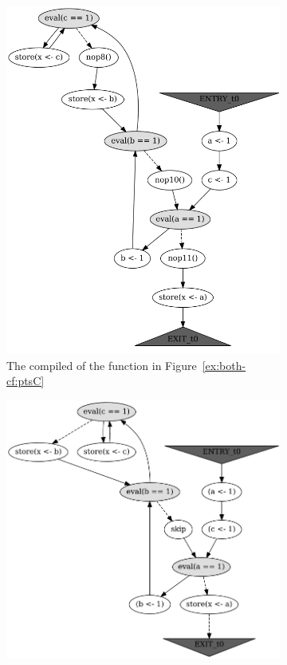 \begin{figure}[!h]
%
\begin{subfigure}[b]{.49\textwidth}\centering
  \includegraphics[width=\textwidth,keepaspectratio]{img/my/graphs/unrolling-comparison/PorthosC/t0.png}
  \hfill
  \caption{The compiled \xgraph{} of the function in Figure~\ref{ex:both-cf:ptsC}}
  \label{ex:both-cf:graph:ptsC}
\end{subfigure}
%
\begin{subfigure}[b]{.49\textwidth}\centering
  \includegraphics[width=\textwidth,keepaspectratio]{img/my/graphs/unrolling-comparison/Porthos/t0.png}

\end{subfigure}
\end{figure}
